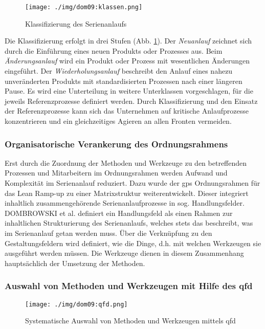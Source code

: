 \begin{figure}[ht]
 \centering
 \texttt{[image: ./img/dom09:klassen.png]}
 \caption[Klassifizierung des Serienanlaufs]{Klassifizierung des Serienanlaufs \cite{Dombrowski2009}}
 \label{fig:anlaufklassen}
\end{figure}

Die Klassifizierung erfolgt in drei Stufen (Abb. \ref{fig:anlaufklassen}). 
Der \textit{Neuanlauf} zeichnet sich durch die Einführung eines neuen Produkts oder Prozesses aus. 
Beim \textit{Änderungsanlauf} wird ein Produkt oder Prozess mit wesentlichen Änderungen eingeführt. Der \textit{Wiederholungsanlauf} beschreibt den Anlauf eines nahezu unveränderten Produkts mit standardisierten Prozessen nach einer längeren Pause. 
Es wird eine Unterteilung in weitere Unterklassen vorgeschlagen, für die jeweils Referenzprozesse definiert werden. 
Durch Klassifizierung und den Einsatz der Referenzprozesse kann sich das Unternehmen auf kritische Anlaufprozesse konzentrieren und ein gleichzeitiges Agieren an allen Fronten vermeiden.

\subsubsection{Organisatorische Verankerung des Ordnungsrahmens}
Erst durch die Zuordnung der Methoden und Werkzeuge zu den betreffenden Prozessen und Mitarbeitern im Ordnungsrahmen werden Aufwand und Komplexität im Serienanlauf reduziert. Dazu wurde der \gls{gps} Ordnungsrahmen für das Lean Ramp-up zu einer Matrixstruktur weiterentwickelt. Dieser integriert inhaltlich zusammengehörende Serienanlaufprozesse in sog. Handlungsfelder. DOMBROWSKI et al. definiert ein Handlungsfeld als einen Rahmen zur inhaltlichen Strukturierung des Serienanlaufs, welches stets das beschreibt, was im Serienanlauf getan werden muss. Über die Verknüpfung zu den Gestaltungsfeldern wird definiert, wie die Dinge, d.h. mit welchen Werkzeugen sie ausgeführt werden müssen. Die Werkzeuge dienen in diesem Zusammenhang hauptsächlich der Umsetzung der Methoden. 

\subsubsection{Auswahl von Methoden und Werkzeugen mit Hilfe des \gls{qfd}}

\begin{figure}[ht]
 \centering
 \texttt{[image: ./img/dom09:qfd.png]}
 \caption[Systematische Auswahl von Methoden und Werkzeugen mittels \gls{qfd}]{Systematische Auswahl von Methoden und Werkzeugen mittels \gls{qfd} \cite{Dombrowski2009}}
 \label{fig:qfd}
\end{figure}


